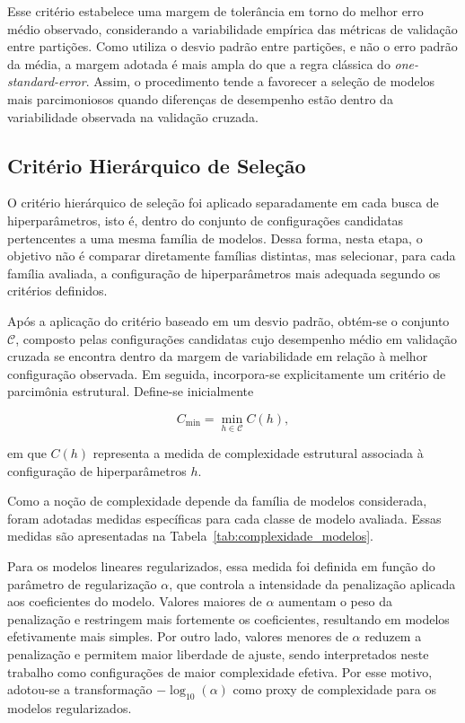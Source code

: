 Esse critério estabelece uma margem de tolerância em torno do melhor erro médio observado, considerando a variabilidade empírica das métricas de validação entre partições. Como utiliza o desvio padrão entre partições, e não o erro padrão da média, a margem adotada é mais ampla do que a regra clássica do \textit{one-standard-error}. Assim, o procedimento tende a favorecer a seleção de modelos mais parcimoniosos quando diferenças de desempenho estão dentro da variabilidade observada na validação cruzada.

\subsection{Critério Hierárquico de Seleção}

O critério hierárquico de seleção foi aplicado separadamente em cada busca de hiperparâmetros, isto é, dentro do conjunto de configurações candidatas pertencentes a uma mesma família de modelos. Dessa forma, nesta etapa, o objetivo não é comparar diretamente famílias distintas, mas selecionar, para cada família avaliada, a configuração de hiperparâmetros mais adequada segundo os critérios definidos.

Após a aplicação do critério baseado em um desvio padrão, obtém-se o conjunto \(\mathcal{C}\), composto pelas configurações candidatas cujo desempenho médio em validação cruzada se encontra dentro da margem de variabilidade em relação à melhor configuração observada. Em seguida, incorpora-se explicitamente um critério de parcimônia estrutural. Define-se inicialmente

\begin{equation}
C_{\min}=\min_{h\in\mathcal{C}} C(h),
\label{eq:complexidade_minima_configuracao}
\end{equation}

\noindent em que \(C(h)\) representa a medida de complexidade estrutural associada à configuração de hiperparâmetros \(h\).

Como a noção de complexidade depende da família de modelos considerada, foram adotadas medidas específicas para cada classe de modelo avaliada. Essas medidas são apresentadas na Tabela~\ref{tab:complexidade_modelos}.

Para os modelos lineares regularizados, essa medida foi definida em função do parâmetro de regularização \(\alpha\), que controla a intensidade da penalização aplicada aos coeficientes do modelo. Valores maiores de \(\alpha\) aumentam o peso da penalização e restringem mais fortemente os coeficientes, resultando em modelos efetivamente mais simples. Por outro lado, valores menores de \(\alpha\) reduzem a penalização e permitem maior liberdade de ajuste, sendo interpretados neste trabalho como configurações de maior complexidade efetiva. Por esse motivo, adotou-se a transformação \(-\log_{10}(\alpha)\) como proxy de complexidade para os modelos regularizados.

